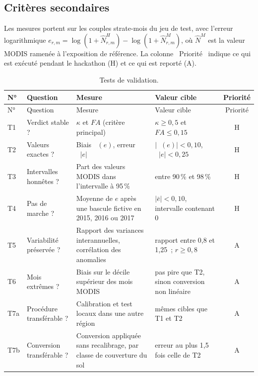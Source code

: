 \documentclass[11pt,a4paper]{article}
\newcommand{\og}{\guillemotleft~}
\newcommand{\fg}{~\guillemotright}
\DeclareMathOperator{\med}{m\acute{e}d}
\begin{document}
\subsection{Critères secondaires}

Les mesures portent sur les couples strate-mois du jeu de test, avec l'erreur logarithmique $e_{r,m} = \log(1+\hat N^H_{r,m}) - \log(1+\hat N^M_{r,m})$, où $\hat N^M$ est la valeur MODIS ramenée à l'exposition de référence. La colonne \og Priorité\fg{} indique ce qui est exécuté pendant le hackathon (H) et ce qui est reporté (A).

\begin{longtable}{>{\raggedright\arraybackslash}p{0.8cm} >{\raggedright\arraybackslash}p{2.8cm} >{\raggedright\arraybackslash}p{5.2cm} >{\raggedright\arraybackslash}p{3.8cm} c}
\caption{Tests de validation.}\label{tab:tests}\\
\toprule
N° & Question & Mesure & Valeur cible & Priorité \\
\midrule\endfirsthead
\toprule
N° & Question & Mesure & Valeur cible & Priorité \\
\midrule\endhead
\small T1 & \small Verdict stable ? & \small $\kappa$ et $FA$ (critère principal) & \small $\kappa \ge 0{,}5$ et $FA \le 0{,}15$ & H \\
\small T2 & \small Valeurs exactes ? & \small Biais $\med(e)$, erreur $\med|e|$ & \small $|\med(e)| < 0{,}10$, $\med|e| < 0{,}25$ & H \\
\small T3 & \small Intervalles honnêtes ? & \small Part des valeurs MODIS dans l'intervalle à 95\,\% & \small entre 90\,\% et 98\,\% & H \\
\small T4 & \small Pas de marche ? & \small Moyenne de $e$ après une bascule fictive en 2015, 2016 ou 2017 & \small $|\bar e| < 0{,}10$, intervalle contenant 0 & H \\
\small T5 & \small Variabilité préservée ? & \small Rapport des variances interannuelles, corrélation des anomalies & \small rapport entre 0,8 et 1,25~; $r \ge 0{,}8$ & A \\
\small T6 & \small Mois extrêmes ? & \small Biais sur le décile supérieur des mois MODIS & \small pas pire que T2, sinon conversion non linéaire & A \\
\small T7a & \small Procédure transférable ? & \small Calibration et test locaux dans une autre région & \small mêmes cibles que T1 et T2 & A \\
\small T7b & \small Conversion transférable ? & \small Conversion appliquée sans recalibrage, par classe de couverture du sol & \small erreur au plus 1,5 fois celle de T2 & A \\

\end{longtable}
\end{document}
